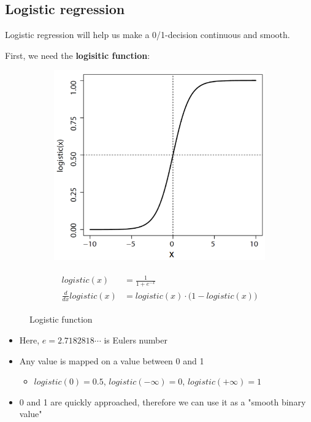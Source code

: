 \subsection{Logistic regression}
Logistic regression will help us make a 0/1-decision continuous and smooth.

First, we need the \textbf{logisitic function}:
\begin{figure}[H]
  \centering
  \begin{subfigure}{0.3\textwidth}
    \centering
    \includegraphics[width=1\textwidth]{assets/regression/lr__log_func.png}
  \end{subfigure}\hspace*{0.05\textwidth}
  \begin{subfigure}{0.6\textwidth}
    \centering
    \begin{align*}\begin{aligned}
      logistic(x) &= \frac{1}{1+e^{-x}}\\
      \frac{d}{dx}logistic(x) &= logistic(x)\cdot\big(1-logistic(x)\big)
    \end{aligned}
    \end{align*}
  \end{subfigure}
  \caption{Logistic function}
  \label{fig:4_logistic_func}
\end{figure}

\begin{itemize}
  \item Here, $e=2.7182818\cdots$ is Eulers number
  \item Any value is mapped on a value between 0 and 1
  \begin{note}\begin{itemize}
    \item $logistic(0)=0.5$, $logistic(-\infty)=0$, $logistic(+\infty)=1$
  \end{itemize}\end{note}
  \item 0 and 1 are quickly approached, therefore we can use it as a "smooth binary value"
\end{itemize}

